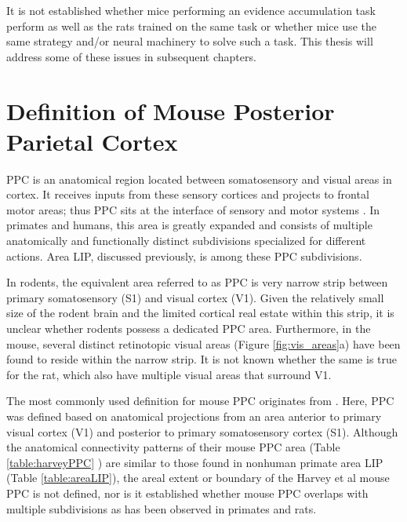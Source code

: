 It is not established whether mice performing an evidence accumulation task perform as well as the rats trained on the same task or whether mice use the same strategy and/or neural machinery to solve such a task. This thesis will address some of these issues in subsequent chapters. 

\section{Definition of Mouse Posterior Parietal Cortex}
PPC is an anatomical region located between somatosensory and visual areas in cortex. It receives inputs from these sensory cortices and projects to frontal motor areas; thus PPC sits at the interface of sensory and motor systems \parencite{Andersen2002}. In primates and humans, this area is greatly expanded and consists of multiple anatomically \parencite{Cavada2001,Cavada1993} and functionally distinct subdivisions \parencite{Andersen2002,Kaas2016} specialized for different actions. Area LIP, discussed previously, is among these PPC subdivisions.\par 

In rodents, the equivalent area referred to as PPC is very narrow strip between primary somatosensory (S1) and visual cortex (V1). Given the relatively small size of the rodent brain and the limited cortical real estate within this strip, it is unclear whether rodents possess a dedicated PPC area. Furthermore, in the mouse, several distinct retinotopic visual areas \parencite{Wang2007} (Figure \ref{fig:vis_areas}a) have been found to reside within the narrow strip. It is not known whether the same is true for the rat, which also have multiple visual areas that surround V1\parencite{Montero1973a,Espinoza1983}. \par 

The most commonly used definition for mouse PPC originates from \textcite{Harvey2012}. Here, PPC was defined based on anatomical projections from an area anterior to primary visual cortex (V1) and posterior to primary somatosensory cortex (S1). Although the anatomical connectivity patterns of their mouse PPC area (Table \ref{table:harveyPPC} ) are similar to those found in nonhuman primate area LIP (Table \ref{table:areaLIP}), the areal extent or boundary of the Harvey et al mouse PPC is not defined, nor is it established whether mouse PPC overlaps with multiple subdivisions as has been observed in primates and rats.\par 

